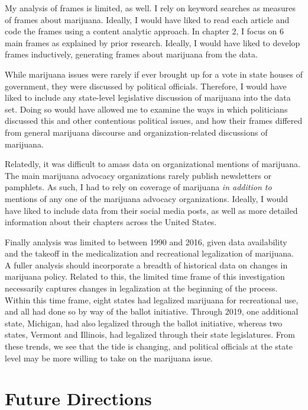 My analysis of frames is limited, as well. I rely on keyword searches as measures of frames about marijuana. Ideally, I would have liked to read each article and code the frames using a content analytic approach. In chapter 2, I focus on 6 main frames as explained by prior research. Ideally, I would have liked to develop frames inductively, generating frames about marijuana from the data. 

While marijuana issues were rarely if ever brought up for a vote in state houses of government, they were discussed by political officials. Therefore, I would have liked to include any state-level legislative discussion of marijuana into the data set. Doing so would have allowed me to examine the ways in which politicians discussed this and other contentious political issues, and how their frames differed from general marijuana discourse and organization-related discussions of marijuana.

Relatedly, it was difficult to amass data on organizational mentions of marijuana. The main marijuana advocacy organizations rarely publish newsletters or pamphlets. As such, I had to rely on coverage of marijuana \textit{in addition to} mentions of any one of the marijuana advocacy organizations. Ideally, I would have liked to include data from their social media posts, as well as more detailed information about their chapters across the United States.

Finally analysis was limited to between 1990 and 2016, given data availability and the takeoff in the medicalization and recreational legalization of marijuana. A fuller analysis should incorporate a breadth of historical data on changes in marijuana policy. Related to this, the limited time frame of this investigation necessarily captures changes in legalization at the beginning of the process. Within this time frame, eight states had legalized marijuana for recreational use, and all had done so by way of the ballot initiative. Through 2019, one additional state, Michigan, had also legalized through the ballot initiative, whereas two states, Vermont and Illinois, had legalized through their state legislatures. From these trends, we see that the tide is changing, and political officials at the state level may be more willing to take on the marijuana issue. 



\section{Future Directions}

